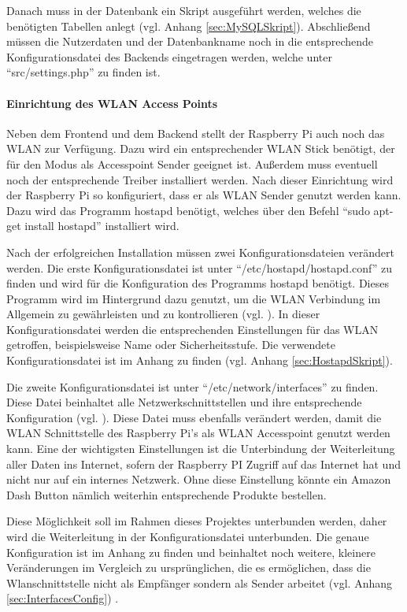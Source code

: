 Danach muss in der Datenbank ein Skript ausgeführt werden, welches die benötigten Tabellen anlegt (vgl. Anhang \ref{sec:MySQLSkript}). Abschließend müssen die Nutzerdaten und der Datenbankname noch in die entsprechende Konfigurationsdatei des Backends eingetragen werden, welche unter ``src/settings.php'' zu finden ist. 

\paragraph{Einrichtung des WLAN Access Points}$\;$ \\ 
\label{sec:Einrichtung des WLAN Access Points-1} 
Neben dem Frontend und dem Backend stellt der Raspberry Pi auch noch das WLAN zur Verfügung. Dazu wird ein entsprechender WLAN Stick benötigt, der für den Modus als Accesspoint Sender geeignet ist. Außerdem muss eventuell noch der entsprechende Treiber installiert werden. Nach dieser Einrichtung wird der Raspberry Pi so konfiguriert, dass er als WLAN Sender genutzt werden kann. Dazu wird das Programm hostapd benötigt, welches über den Befehl ``sudo apt-get install hostapd'' installiert wird. 

Nach der erfolgreichen Installation müssen zwei Konfigurationsdateien verändert werden. Die erste Konfigurationsdatei ist unter ``/etc/hostapd/hostapd.conf'' zu finden und wird für die Konfiguration des Programms hostapd benötigt. Dieses Programm wird im Hintergrund dazu genutzt, um die WLAN Verbindung im Allgemein zu gewährleisten und zu kontrollieren (vgl. \cite{.o}\cite{.n}). In dieser Konfigurationsdatei werden die entsprechenden Einstellungen für das WLAN getroffen, beispielsweise Name oder Sicherheitsstufe. Die verwendete Konfigurationsdatei ist im Anhang zu finden (vgl. Anhang \ref{sec:HostapdSkript}).

Die zweite Konfigurationsdatei ist unter ``/etc/network/interfaces'' zu finden. Diese Datei beinhaltet alle Netzwerkschnittstellen und ihre entsprechende Konfiguration (vgl. \cite{.p}). Diese Datei muss ebenfalls verändert werden, damit die WLAN Schnittstelle des Raspberry Pi's als WLAN Accesspoint genutzt werden kann. Eine der wichtigsten Einstellungen ist die Unterbindung der Weiterleitung aller Daten ins Internet, sofern der Raspberry PI Zugriff auf das Internet hat und nicht nur auf ein internes Netzwerk. Ohne diese Einstellung könnte ein Amazon Dash Button nämlich weiterhin entsprechende Produkte bestellen. 

Diese Möglichkeit soll im Rahmen dieses Projektes unterbunden werden, daher wird die Weiterleitung in der Konfigurationsdatei unterbunden. Die genaue Konfiguration ist im Anhang zu finden und beinhaltet noch weitere, kleinere Veränderungen im Vergleich zu ursprünglichen, die es ermöglichen, dass die Wlanschnittstelle nicht als Empfänger sondern als Sender arbeitet (vgl. Anhang \ref{sec:InterfacesConfig}) .

